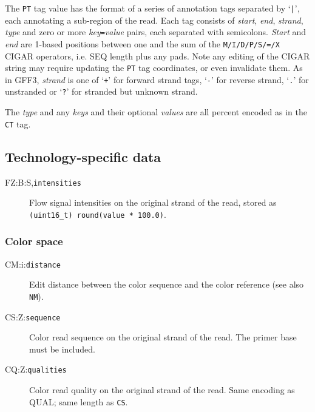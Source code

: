 \documentclass[10pt]{article}
\newcommand{\tagvalue}[1]{{\tt #1}}
\begin{document}
\begin{description}
The {\tt PT} tag value has the format of a series of annotation
tags separated by `{\tt |}', each annotating a sub-region of the read.
Each tag consists of \emph{start}, \emph{end}, \emph{strand},
\emph{type} and zero or more \emph{key}{\tt =}\emph{value} pairs, each
separated with semicolons. \emph{Start} and \emph{end} are 1-based
positions between one and the sum of the {\tt M/I/D/P/S/=/X}
{\sf CIGAR} operators, i.e. {\sf SEQ} length plus any pads.  Note
any editing of the CIGAR string may require updating the {\tt PT}
tag coordinates, or even invalidate them.
As in GFF3, \emph{strand} is one of `{\tt +}' for forward strand tags,
`{\tt -}' for reverse strand, `{\tt .}' for unstranded or `{\tt ?}'
for stranded but unknown strand.

The \emph{type} and any \emph{keys} and their optional \emph{values}
are all percent encoded as in the {\tt CT} tag.
\end{description}

\subsection{Technology-specific data}

\begin{description}
\item[FZ:B:S,\tagvalue{intensities}]
Flow signal intensities on the original strand of the read, stored as {\tt (uint16\_t) round(value * 100.0)}.
\end{description}

\subsubsection{Color space}


\begin{description}
\item[CM:i:\tagvalue{distance}]
Edit distance between the color sequence and the color reference (see also {\tt NM}).

\item[CS:Z:\tagvalue{sequence}]
Color read sequence on the original strand of the read. The primer base must be included.

\item[CQ:Z:\tagvalue{qualities}]
Color read quality on the original strand of the read. Same encoding as {\sf QUAL}; same length as {\tt CS}.
\end{description}
\end{document}
